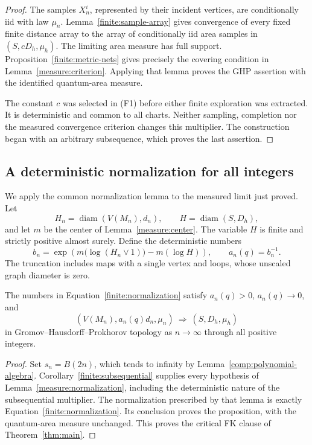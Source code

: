 \begin{proof}
The samples \(X_n^i\), represented by their incident vertices, are
conditionally iid with law \(\mu_n\).
Lemma~\ref{finite:sample-array} gives convergence of every fixed
finite distance array to the array of conditionally iid area samples
in \((S,cD_h,\mu_h)\). The limiting area measure has full support.
Proposition~\ref{finite:metric-nets} gives precisely the covering
condition in Lemma~\ref{measure:criterion}. Applying that lemma proves
the GHP assertion with the identified quantum-area measure.

The constant \(c\) was selected in (F1) before either finite exploration
was extracted. It is deterministic and common to all charts. Neither
sampling, completion nor the measured convergence criterion changes
this multiplier. The construction began with an arbitrary subsequence,
which proves the last assertion.
\end{proof}

\subsection{A deterministic normalization for all integers}

We apply the common normalization lemma to the measured limit just
proved. Let
\[
 H_n=\operatorname{diam}(V(M_n),d_n),
 \qquad H=\operatorname{diam}(S,D_h),
\]
and let \(m\) be the center of Lemma~\ref{measure:center}.
The variable \(H\) is finite and strictly positive almost surely.
Define the deterministic numbers
\begin{equation}\label{finite:normalization}
 b_n=\exp\!\left(
       m\big(\log(H_n\vee1)\big)-m(\log H)
      \right),
 \qquad a_n(q)=b_n^{-1}.
\end{equation}
The truncation includes maps with a single vertex and loops, whose
unscaled graph diameter is zero.

\begin{proposition}
\label{finite:full-sequence}
The numbers in Equation~\eqref{finite:normalization} satisfy
\mbox{\(a_n(q)>0\)}, \(a_n(q)\to0\), and
\[
              (V(M_n),a_n(q)d_n,\mu_n)
                    \ \Longrightarrow\ (S,D_h,\mu_h)
\]
in Gromov--Hausdorff--Prokhorov topology as \(n\to\infty\) through
all positive integers.
\end{proposition}

\begin{proof}
Set \(s_n=B(2n)\), which tends to infinity by
Lemma~\ref{comp:polynomial-algebra}.
Corollary~\ref{finite:subsequential} supplies every hypothesis of
Lemma~\ref{measure:normalization}, including the deterministic nature
of the subsequential multiplier. The normalization prescribed by that
lemma is exactly Equation~\eqref{finite:normalization}. Its conclusion
proves the proposition, with the quantum-area measure unchanged.
This proves the critical FK clause of Theorem~\ref{thm:main}.
\end{proof}

